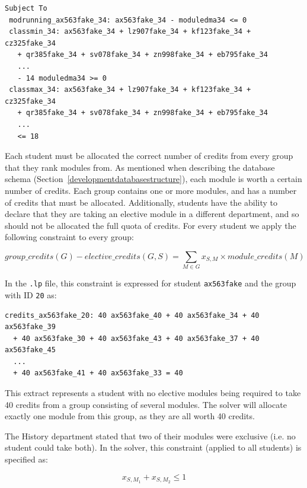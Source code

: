 \begin{lstlisting}
Subject To
 modrunning_ax563fake_34: ax563fake_34 - moduledma34 <= 0
 classmin_34: ax563fake_34 + lz907fake_34 + kf123fake_34 + cz325fake_34
   + qr385fake_34 + sv078fake_34 + zn998fake_34 + eb795fake_34
   ...
   - 14 moduledma34 >= 0
 classmax_34: ax563fake_34 + lz907fake_34 + kf123fake_34 + cz325fake_34
   + qr385fake_34 + sv078fake_34 + zn998fake_34 + eb795fake_34
   ...
   <= 18
\end{lstlisting}


Each student must be allocated the correct number of credits from every group
that they rank modules from. As mentioned when describing the database schema
(Section~\ref{developmentdatabasestructure}), each module is worth a certain
number of credits. Each group contains one or more modules, and has a number
of credits that must be allocated. Additionally, students have the ability to
declare that they are taking an elective module in a different department, and
so should not be allocated the full quota of credits. For every student we
apply the following constraint to every group:

$$
group\_credits(G) - elective\_credits(G,S) = \displaystyle\sum_{M \in G} x_{S,M} \times module\_credits(M)
$$

In the \texttt{.lp} file, this constraint is expressed for student
\texttt{ax563fake} and the group with ID \texttt{20} as:

\begin{lstlisting}
credits_ax563fake_20: 40 ax563fake_40 + 40 ax563fake_34 + 40 ax563fake_39
  + 40 ax563fake_30 + 40 ax563fake_43 + 40 ax563fake_37 + 40 ax563fake_45
  ...
  + 40 ax563fake_41 + 40 ax563fake_33 = 40
\end{lstlisting}

This extract represents a student with no elective modules being required to
take 40 credits from a group consisting of several modules. The solver will
allocate exactly one module from this group, as they are all worth 40 credits.


The History department stated that two of their modules were exclusive (i.e.
no student could take both). In the solver, this constraint (applied to all
students) is specified as:

$$
x_{S,M_1} + x_{S,M_2} \leq 1
$$


